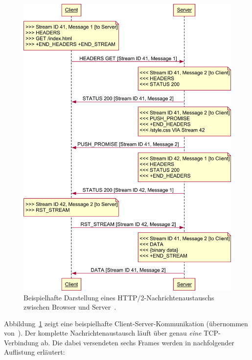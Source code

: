 \documentclass[a4paper, justified, notoc]{tufte-handout} %
\begin{document}
\begin{figure}%
	\centering
  \includegraphics[width=1\textwidth]{./figures/http2_streams.png}
  \caption{Beispielhafte Darstellung eines HTTP/2-Nachrichtenaustauschs zwischen Browser und Server~\citep{weinschenkler:2017}.}
  \label{fig:http2_nachrichtenaustausch}
\end{figure}

Abbildung~\ref{fig:http2_nachrichtenaustausch} zeigt eine beispielhafte Client-Server-Kommunikation (übernommen von~\citep{weinschenkler:2017}). Der komplette Nachrichtenaustausch läuft über genau \emph{eine} TCP-Verbindung ab. Die dabei versendeten sechs Frames werden in nachfolgender Auflistung erläutert:
\end{document}
